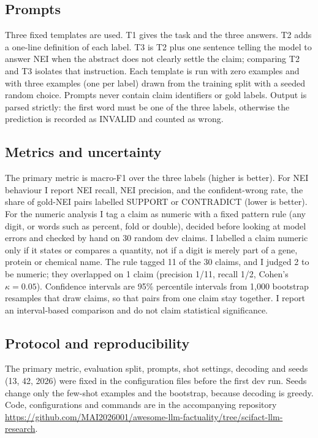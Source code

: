 \documentclass[conference]{IEEEtran}
\begin{document}
\subsection{Prompts}
Three fixed templates are used. T1 gives the task and the three answers. T2 adds a one-line definition of each label. T3 is T2 plus one sentence telling the model to answer NEI when the abstract does not clearly settle the claim; comparing T2 and T3 isolates that instruction. Each template is run with zero examples and with three examples (one per label) drawn from the training split with a seeded random choice. Prompts never contain claim identifiers or gold labels. Output is parsed strictly: the first word must be one of the three labels, otherwise the prediction is recorded as INVALID and counted as wrong.

\subsection{Metrics and uncertainty}
The primary metric is macro-F1 over the three labels (higher is better). For NEI behaviour I report NEI recall, NEI precision, and the confident-wrong rate, the share of gold-NEI pairs labelled SUPPORT or CONTRADICT (lower is better). For the numeric analysis I tag a claim as numeric with a fixed pattern rule (any digit, or words such as percent, fold or double), decided before looking at model errors and checked by hand on 30 random dev claims. I labelled a claim numeric only if it states or compares a quantity, not if a digit is merely part of a gene, protein or chemical name. The rule tagged 11 of the 30 claims, and I judged 2 to be numeric; they overlapped on 1 claim (precision 1/11, recall 1/2, Cohen's $\kappa=0.05$). Confidence intervals are 95\% percentile intervals from 1{,}000 bootstrap resamples that draw claims, so that pairs from one claim stay together. I report an interval-based comparison and do not claim statistical significance.

\subsection{Protocol and reproducibility}
The primary metric, evaluation split, prompts, shot settings, decoding and seeds (13, 42, 2026) were fixed in the configuration files before the first dev run. Seeds change only the few-shot examples and the bootstrap, because decoding is greedy. Code, configurations and commands are in the accompanying repository \url{https://github.com/MAI2026001/awesome-llm-factuality/tree/scifact-llm-research}.
\end{document}
